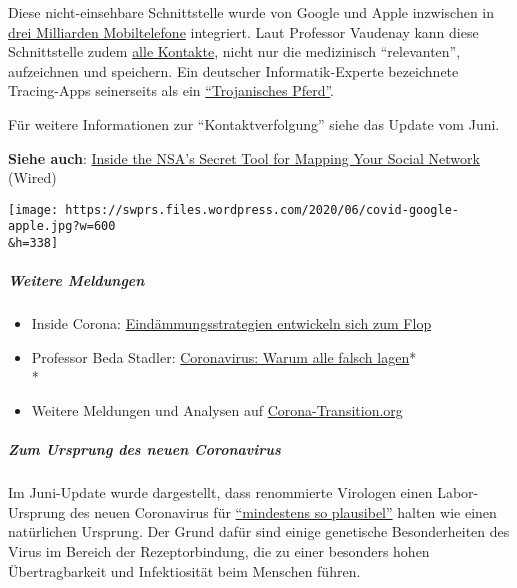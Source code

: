 Diese nicht-einsehbare Schnittstelle wurde von Google und Apple
inzwischen in
\href{https://www.bloomberg.com/news/articles/2020-04-10/apple-google-bring-covid-19-contact-tracing-to-3-billion-people}{drei
Milliarden Mobiltelefone} integriert. Laut Professor Vaudenay kann diese
Schnittstelle zudem
\href{https://swprs.org/corona-app-ein-eklatanter-betrug/}{alle
Kontakte}, nicht nur die medizinisch ``relevanten'', aufzeichnen und
speichern. Ein deutscher Informatik-Experte bezeichnete Tracing-Apps
seinerseits als ein
\href{https://www.heise.de/news/Informatiker-Die-Corona-App-ist-wie-ein-trojanisches-Pferd-4764560.html}{``Trojanisches
Pferd''}.

Für weitere Informationen zur ``Kontaktverfolgung'' siehe das Update vom
Juni.

\textbf{Siehe auch}:
\href{https://www.wired.com/story/inside-the-nsas-secret-tool-for-mapping-your-social-network/}{Inside
the NSA's Secret Tool for Mapping Your Social Network} (Wired)

\texttt{[image: https://swprs.files.wordpress.com/2020/06/covid-google-apple.jpg?w=600\\\&h=338]}

\hypertarget{weitere-meldungen}{%
\subparagraph{\texorpdfstring{\textbf{Weitere
Meldungen}}{Weitere Meldungen}}\label{weitere-meldungen}}

\begin{itemize}
\tightlist
\item
  Inside Corona:
  \href{https://www.insidecorona.ch/2020/06/24/eind\%C3\%A4mmungsstrategien-entwickeln-sich-zum-flop/}{Eindämmungsstrategien
  entwickeln sich zum Flop}
\item
  Professor Beda Stadler:
  \href{https://www.achgut.com/artikel/corona_aufarbeitung_warum_alle_falsch_lagen}{Coronavirus:
  Warum alle falsch lagen}*\\
  *
\item
  Weitere Meldungen und Analysen auf
  \href{https://corona-transition.org/}{Corona-Transition.org}
\end{itemize}

\hypertarget{zum-ursprung-des-neuen-coronavirus-1}{%
\subparagraph{\texorpdfstring{\textbf{Zum Ursprung des neuen
Coronavirus}}{Zum Ursprung des neuen Coronavirus}}\label{zum-ursprung-des-neuen-coronavirus-1}}

Im Juni-Update wurde dargestellt, dass renommierte Virologen einen
Labor-Ursprung des neuen Coronavirus für
\href{https://www.independentsciencenews.org/health/the-case-is-building-that-covid-19-had-a-lab-origin/}{``mindestens
so plausibel''} halten wie einen natürlichen Ursprung. Der Grund dafür
sind einige genetische Besonderheiten des Virus im Bereich der
Rezeptorbindung, die zu einer besonders hohen Übertragbarkeit und
Infektiosität beim Menschen führen.

